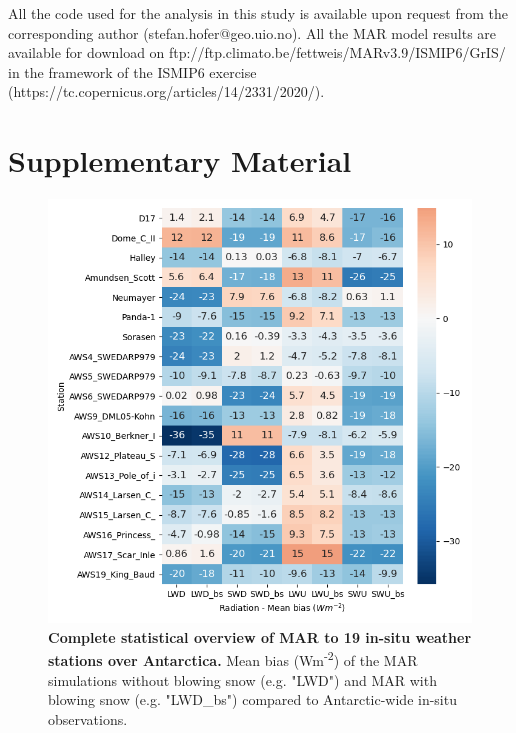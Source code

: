 \documentclass[12pt]{article}
\begin{document}
%
All the code used for the analysis in this study is available upon request from the corresponding author (stefan.hofer@geo.uio.no). All the MAR model results are available for download on ftp://ftp.climato.be/fettweis/MARv3.9/ISMIP6/GrIS/ in the framework of the ISMIP6 exercise (https://tc.copernicus.org/articles/14/2331/2020/).


\section*{Supplementary Material}

\begin{figure}[H]
	\includegraphics[scale=0.9,center]{heatmap_all_mb.png}
	\caption{\textbf{Complete statistical overview of MAR to 19 in-situ weather stations over Antarctica.} Mean bias (Wm\textsuperscript{-2}) of the MAR simulations without blowing snow (e.g. "LWD") and MAR with blowing snow (e.g. "LWD\_bs") compared to Antarctic-wide in-situ observations. }
	\label{fig:heat_all}
\end{figure}
\end{document}
